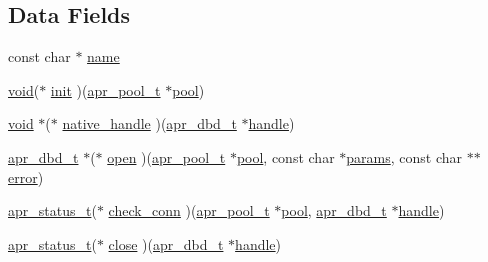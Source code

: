 \subsection*{Data Fields}
\begin{DoxyCompactItemize}
\item 
const char $\ast$ \hyperlink{structapr__dbd__driver__t_a5483b4c47dde6814395bebfb7959fb37}{name}
\item 
\hyperlink{group__MOD__ISAPI_gacd6cdbf73df3d9eed42fa493d9b621a6}{void}($\ast$ \hyperlink{structapr__dbd__driver__t_abe128d58439959850b95c8ff8ebd89a1}{init} )(\hyperlink{structapr__pool__t}{apr\+\_\+pool\+\_\+t} $\ast$\hyperlink{group__APR__XLATE_gabb3cd978f04c73d0b763c391e9bfde73}{pool})
\item 
\hyperlink{group__MOD__ISAPI_gacd6cdbf73df3d9eed42fa493d9b621a6}{void} $\ast$($\ast$ \hyperlink{structapr__dbd__driver__t_aa26831269f6f2255e39d67dcfc95f3a4}{native\+\_\+handle} )(\hyperlink{group__APR__Util__DBD_ga4738c1f6340184987fc7806522c18ab8}{apr\+\_\+dbd\+\_\+t} $\ast$\hyperlink{group__APR__Util__DBD_ga3ae8808b1c40205ec08c75783ac68810}{handle})
\item 
\hyperlink{group__APR__Util__DBD_ga4738c1f6340184987fc7806522c18ab8}{apr\+\_\+dbd\+\_\+t} $\ast$($\ast$ \hyperlink{structapr__dbd__driver__t_a5ff28470f647176e6ea26e8207ab02dd}{open} )(\hyperlink{structapr__pool__t}{apr\+\_\+pool\+\_\+t} $\ast$\hyperlink{group__APR__XLATE_gabb3cd978f04c73d0b763c391e9bfde73}{pool}, const char $\ast$\hyperlink{group__APR__Util__RL_ga1d35e736cdbc73587323e02e92a68713}{params}, const char $\ast$$\ast$\hyperlink{structapr__dbd__driver__t_a96a1e0b8f3790421e1027671a51ca698}{error})
\item 
\hyperlink{group__apr__errno_gaa5105fa83cc322f09382292db8b47593}{apr\+\_\+status\+\_\+t}($\ast$ \hyperlink{structapr__dbd__driver__t_a644f9d26c9a3f3ebbde35fcc5caa7903}{check\+\_\+conn} )(\hyperlink{structapr__pool__t}{apr\+\_\+pool\+\_\+t} $\ast$\hyperlink{group__APR__XLATE_gabb3cd978f04c73d0b763c391e9bfde73}{pool}, \hyperlink{group__APR__Util__DBD_ga4738c1f6340184987fc7806522c18ab8}{apr\+\_\+dbd\+\_\+t} $\ast$\hyperlink{group__APR__Util__DBD_ga3ae8808b1c40205ec08c75783ac68810}{handle})
\item 
\hyperlink{group__apr__errno_gaa5105fa83cc322f09382292db8b47593}{apr\+\_\+status\+\_\+t}($\ast$ \hyperlink{structapr__dbd__driver__t_a51f2fb88a8f6d109e859e470c12922e2}{close} )(\hyperlink{group__APR__Util__DBD_ga4738c1f6340184987fc7806522c18ab8}{apr\+\_\+dbd\+\_\+t} $\ast$\hyperlink{group__APR__Util__DBD_ga3ae8808b1c40205ec08c75783ac68810}{handle})
$$
\end{DoxyCompactItemize}
